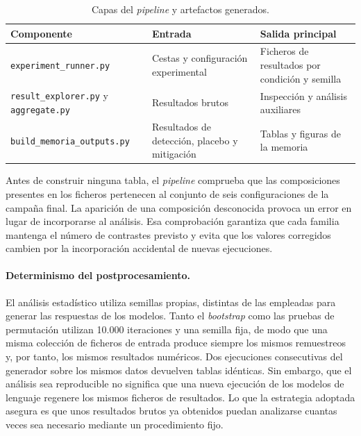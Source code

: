 \begin{table}[htbp]
	\centering
	\caption{Capas del \textit{pipeline} y artefactos generados.}
	\label{tab:pipeline_outputs}
	\small
	\begin{tabular}{p{4.8cm} p{4.2cm} p{4.6cm}}
		\hline
		\textbf{Componente} & \textbf{Entrada} & \textbf{Salida principal} \\
		\hline
		
		\texttt{experiment\_runner.py}
		& Cestas y configuración experimental
		& Ficheros de resultados por condición y semilla \\
		
		\texttt{result\_explorer.py} y \texttt{aggregate.py}
		& Resultados brutos
		& Inspección y análisis auxiliares \\
		
		\texttt{build\_memoria\_outputs.py}
		& Resultados de detección, placebo y mitigación
		& Tablas y figuras de la memoria \\
		
		\hline
	\end{tabular}
\end{table}

Antes de construir ninguna tabla, el \textit{pipeline} comprueba que las composiciones presentes en los ficheros pertenecen al conjunto de seis configuraciones de la campaña final. La aparición de una composición desconocida provoca un error en lugar de incorporarse al análisis. Esa comprobación garantiza que cada familia mantenga el número de contrastes previsto y evita que los valores corregidos cambien por la incorporación accidental de nuevas ejecuciones.

\paragraph{Determinismo del postprocesamiento.}
El análisis estadístico utiliza semillas propias, distintas de las empleadas para generar las respuestas de los modelos. Tanto el \textit{bootstrap} como las pruebas de permutación utilizan 10.000 iteraciones y una semilla fija, de modo que una misma colección de ficheros de entrada produce siempre los mismos remuestreos y, por tanto, los mismos resultados numéricos. Dos ejecuciones consecutivas del generador sobre los mismos datos devuelven tablas idénticas. Sin embargo, que el análisis sea reproducible no significa que una nueva ejecución de los modelos de lenguaje regenere los mismos ficheros de resultados. Lo que la estrategia adoptada asegura es que unos resultados brutos ya obtenidos puedan analizarse cuantas veces sea necesario mediante un procedimiento fijo.

